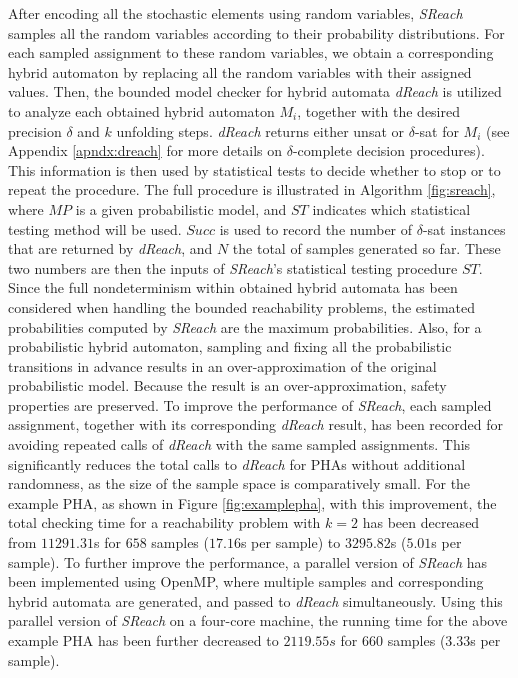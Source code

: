 After encoding all the stochastic elements using random variables, {\it SReach} samples all the random variables according to their probability distributions. For each sampled assignment to these random variables, we obtain a corresponding hybrid automaton by replacing all the random variables with their assigned values. Then, the bounded model checker for hybrid automata {\it dReach} \cite{gaodelta} is utilized to analyze each obtained hybrid automaton $M_i$, together with the desired precision $\delta$ and $k$ unfolding steps. {\it dReach} returns either unsat or $\delta$-sat for $M_i$ (see Appendix \ref{apndx:dreach} for more details on $\delta$-complete decision procedures). This information
is then used by statistical tests to decide whether to stop or to repeat the procedure. The full procedure is illustrated in Algorithm \ref{fig:sreach}, where $MP$ is a given probabilistic model, and $ST$ indicates which statistical testing method will be used. $Succ$ is used to record the number of $\delta$-sat instances that are returned by {\it dReach}, and $N$ the total of samples generated so far. These two numbers are then the inputs of {\it SReach}'s statistical testing procedure $ST$. Since the full nondeterminism within obtained hybrid automata has been considered when handling the bounded reachability problems, the estimated probabilities computed by {\it SReach} are the maximum probabilities. Also, for a probabilistic hybrid automaton, sampling and fixing all the probabilistic transitions in advance results in an over-approximation of the original probabilistic model. Because the result is an over-approximation, safety properties are preserved. To improve the performance of {\it SReach}, each sampled assignment, together with its corresponding {\it dReach} result, has been recorded for avoiding repeated calls of {\it dReach} with the same sampled assignments. This significantly reduces the total calls to {\it dReach} for PHAs without additional randomness, as the size of the sample space is comparatively small. For the example PHA, as shown in Figure \ref{fig:examplepha}, with this improvement, the total checking time for a reachability problem with $k=2$ has been decreased from $11291.31$s for $658$ samples ($17.16$s per sample) to $3295.82$s ($5.01$s per sample). To further improve the performance, a parallel version of {\it SReach} has been implemented using OpenMP, where multiple samples and corresponding hybrid automata are generated, and passed to {\it dReach} simultaneously. Using this parallel version of {\it SReach} on a four-core machine, the running time for the above example PHA has been further decreased to $2119.55s$ for $660$ samples ($3.33$s per sample). 
